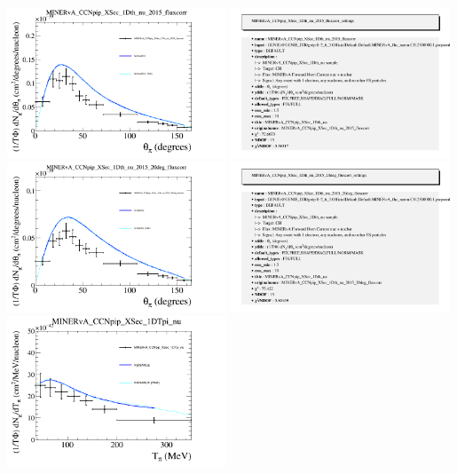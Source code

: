 \documentclass{article}
\begin{document}
\centering
\includegraphics[width=0.49\textwidth]{figures/nuisance_MINERvA_CCNpip_XSec_1Dth_nu_2015_fluxcorr_comp.png}
\includegraphics[width=0.49\textwidth]{figures/nuisance_MINERvA_CCNpip_XSec_1Dth_nu_2015_fluxcorr_info.png}
\centering
\includegraphics[width=0.49\textwidth]{figures/nuisance_MINERvA_CCNpip_XSec_1Dth_nu_2015_20deg_fluxcorr_comp.png}
\includegraphics[width=0.49\textwidth]{figures/nuisance_MINERvA_CCNpip_XSec_1Dth_nu_2015_20deg_fluxcorr_info.png}
\centering
\includegraphics[width=0.49\textwidth]{figures/nuisance_MINERvA_CCNpip_XSec_1DTpi_nu_comp.png}
\end{document}
